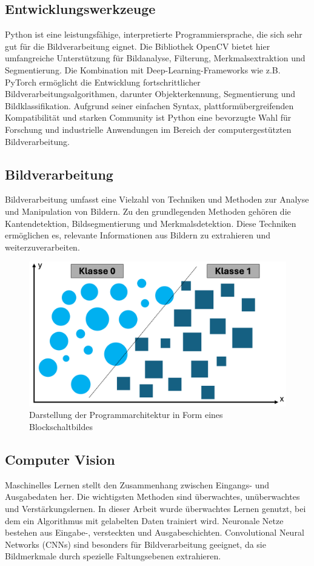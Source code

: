 \documentclass[journal,twoside,web]{ieeecolor}
\begin{document}
\subsection{Entwicklungswerkzeuge}
\label{sec:tools}
Python ist eine leistungsfähige, interpretierte Programmiersprache, die sich sehr gut für die Bildverarbeitung eignet. Die Bibliothek OpenCV bietet hier umfangreiche Unterstützung für Bildanalyse, Filterung, Merkmalsextraktion und Segmentierung. Die Kombination mit Deep-Learning-Frameworks wie z.B. PyTorch ermöglicht die Entwicklung fortschrittlicher Bildverarbeitungsalgorithmen, darunter Objekterkennung, Segmentierung und Bildklassifikation. Aufgrund seiner einfachen Syntax, plattformübergreifenden Kompatibilität und starken Community ist Python eine bevorzugte Wahl für Forschung und industrielle Anwendungen im Bereich der computergestützten Bildverarbeitung.

\subsection{Bildverarbeitung}
\label{sec:image_processing}
Bildverarbeitung umfasst eine Vielzahl von Techniken und Methoden zur Analyse und Manipulation von Bildern. Zu den grundlegenden Methoden gehören die Kantendetektion, Bildsegmentierung und Merkmalsdetektion. Diese Techniken ermöglichen es, relevante Informationen aus Bildern zu extrahieren und weiterzuverarbeiten. 

\begin{figure}[H]
    \centerline{\includegraphics[width=\columnwidth]{binaere_klassifikation.png}}
    \caption{Darstellung der Programmarchitektur in Form eines Blockschaltbildes}
    \label{fig:bin_class}
\end{figure}

\subsection{Computer Vision}
\label{sec:computer_vision} 
Maschinelles Lernen stellt den Zusammenhang zwischen Eingangs- und Ausgabedaten her. Die wichtigsten Methoden sind überwachtes, unüberwachtes und Verstärkungslernen. In dieser Arbeit wurde überwachtes Lernen genutzt, bei dem ein Algorithmus mit gelabelten Daten trainiert wird. Neuronale Netze bestehen aus Eingabe-, versteckten und Ausgabeschichten. Convolutional Neural Networks (CNNs) sind besonders für Bildverarbeitung geeignet, da sie Bildmerkmale durch spezielle Faltungsebenen extrahieren.
\end{document}
